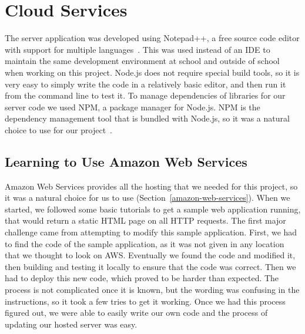 \documentclass[12pt]{report}
\let\Oldsection\section
\renewcommand{\section}{\FloatBarrier\Oldsection}
\let\Oldsubsection\subsection
\renewcommand{\subsection}{\FloatBarrier\Oldsubsection}
\begin{document}


\section{Cloud Services} \label{cloud-services}

The server application was developed using Notepad++, a free source code editor with support
for multiple languages~\autocite{NOTEPADPLUSPLUS}. This was used instead of an IDE to maintain the same development
environment at school and outside of school when working on this project. Node.js does not
require special build tools, so it is very easy to simply write the code in a relatively basic
editor, and then run it from the command line to test it. To manage dependencies of libraries
for our server code we used NPM, a package manager for Node.js. NPM is the dependency management
tool that is bundled with Node.js, so it was a natural choice to use for our project~\autocite{NODENPM}.



\subsection{Learning to Use Amazon Web Services} \label{learning-to-use-amazon-web-services}

Amazon Web Services provides all the hosting that we needed for this project, so it was a
natural choice for us to use (Section~\ref{amazon-web-services}). When we started, we followed
some basic tutorials to get a sample
web application running, that would return a static HTML page on all HTTP requests. The first
major challenge came from attempting to modify this sample application. First, we had to find
the code of the sample application, as it was not given in any location that we thought to look on
AWS. Eventually we found the code and modified it, then building and testing it locally to
ensure that the code was correct. Then we had to deploy this new code, which proved to be
harder than expected. The process is not complicated once it is known, but the wording was
confusing in the instructions, so it took a few tries to get it working. Once we had this process
figured out, we were able to easily write our own code and the process of updating our hosted
server was easy.
\end{document}
